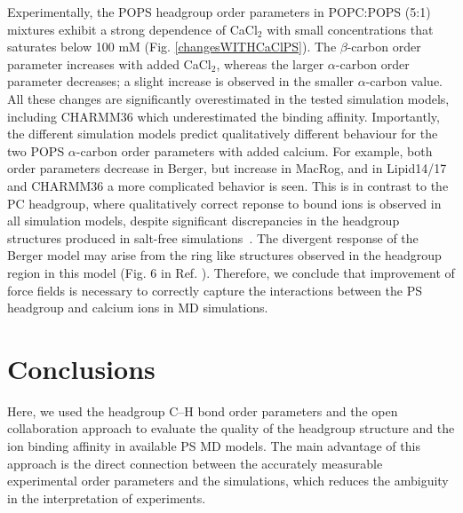 \documentclass[aps,prl,superscriptaddress,twocolumn]{revtex4}
\begin{document}
Experimentally, the POPS headgroup order parameters in POPC:POPS (5:1) mixtures
exhibit a strong dependence of CaCl$_2$ with small concentrations that saturates below 100 mM (Fig. \ref{changesWITHCaClPS}).
The $\beta$-carbon order parameter increases with added CaCl$_2$,
whereas the larger $\alpha$-carbon order parameter decreases; a slight increase is observed in
the smaller $\alpha$-carbon value. All these changes are significantly overestimated in the
tested simulation models, including CHARMM36 which underestimated the binding affinity.
Importantly, the different simulation models predict qualitatively different behaviour
for the two POPS $\alpha$-carbon order parameters with added calcium.
For example, both order parameters decrease in Berger, but increase
in MacRog, and in Lipid14/17 and CHARMM36 a more complicated behavior is seen.
This is in contrast to the PC headgroup, where
qualitatively correct reponse to bound ions is observed
in all simulation models, despite significant discrepancies in the headgroup
structures produced in salt-free simulations~\cite{catte16}.
The divergent response of the Berger model may arise from the ring like structures
observed in the headgroup region in this model (Fig. 6 in Ref. ).
Therefore, we conclude that
improvement of force fields is necessary to correctly capture the interactions between the
PS headgroup and calcium ions in MD simulations.
\section{Conclusions}

Here, we used the headgroup C--H bond order parameters and the open collaboration approach to evaluate the quality
of the headgroup structure and the ion binding affinity 
in available PS MD models.
The main advantage of this approach is the direct connection
between the accurately measurable experimental order parameters and the simulations,
which reduces the ambiguity in the interpretation of experiments.
\end{document}
